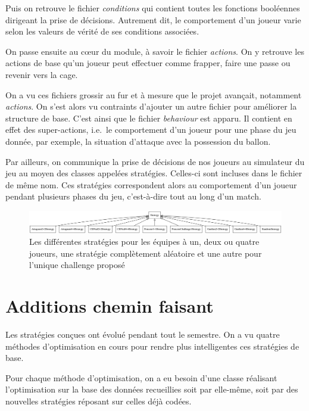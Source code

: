 \documentclass[12pt,a4paper]{article}
\begin{document}
Puis on retrouve le fichier {\itshape conditions} qui contient toutes les 
fonctions bool\'eennes dirigeant la prise de d\'ecisions. Autrement dit, le 
comportement d'un joueur varie selon les valeurs de v\'erit\'e de ses 
conditions associ\'ees.

On passe ensuite au c\oe ur du module, \`a savoir le fichier {\itshape 
actions}. On y retrouve les actions de base qu'un joueur peut effectuer comme 
frapper, faire une passe ou revenir vers la cage.

On a vu ces fichiers grossir au fur et \`a mesure que le projet avan\c{c}ait, 
notamment {\itshape actions}. On s'est alors vu contraints 
d'ajouter un autre fichier pour am\'eliorer la structure de base. C'est ainsi 
que le fichier {\itshape behaviour} est apparu. Il contient en effet des 
super-actions, i.e.\ le comportement d'un joueur pour une phase du jeu 
donn\'ee, par exemple, la situation d'attaque avec la possession du ballon.

Par ailleurs, on communique la prise de d\'ecisions de nos joueurs au 
simulateur du jeu au moyen des classes appel\'ees strat\'egies. Celles-ci sont 
incluses dans le fichier de m\^eme nom. Ces strat\'egies correspondent alors au 
comportement d'un joueur pendant plusieurs phases du jeu, c'est-\`a-dire tout 
au long d'un match.

\begin{figure}[!h]
  \centering
  \captionsetup{justification=centering}
  \includegraphics[width=1.\textwidth]{baseStrategies}
  \caption[Les strat\'egies de base]{Les diff\'erentes strat\'egies pour les 
\'equipes \`a un, deux ou quatre joueurs, une strat\'egie compl\`etement 
al\'eatoire et une autre pour l'unique challenge propos\'e}
  \label{fig:strats}
\end{figure}

\section{Additions chemin faisant}
Les strat\'egies con\c{c}ues ont \'evolu\'e pendant tout le semestre. On a vu 
quatre m\'ethodes d'optimisation en cours pour rendre plus intelligentes 
ces strat\'egies de base.

Pour chaque m\'ethode d'optimisation, on a eu besoin d'une classe r\'ealisant 
l'optimisation sur la base des donn\'ees recueillies soit par elle-m\^eme, soit 
par des nouvelles strat\'egies r\'eposant sur celles d\'ej\`a cod\'ees.
\end{document}
